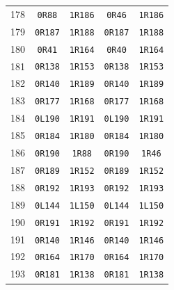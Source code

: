 \begin{longtable}{rcccc}
178 & \texttt{0R88} & \texttt{1R186} & \texttt{0R46} & \texttt{1R186} \\
179 & \texttt{0R187} & \texttt{1R188} & \texttt{0R187} & \texttt{1R188} \\
180 & \texttt{0R41} & \texttt{1R164} & \texttt{0R40} & \texttt{1R164} \\
181 & \texttt{0R138} & \texttt{1R153} & \texttt{0R138} & \texttt{1R153} \\
182 & \texttt{0R140} & \texttt{1R189} & \texttt{0R140} & \texttt{1R189} \\
183 & \texttt{0R177} & \texttt{1R168} & \texttt{0R177} & \texttt{1R168} \\
184 & \texttt{0L190} & \texttt{1R191} & \texttt{0L190} & \texttt{1R191} \\
185 & \texttt{0R184} & \texttt{1R180} & \texttt{0R184} & \texttt{1R180} \\
186 & \texttt{0R190} & \texttt{1R88} & \texttt{0R190} & \texttt{1R46} \\
187 & \texttt{0R189} & \texttt{1R152} & \texttt{0R189} & \texttt{1R152} \\
188 & \texttt{0R192} & \texttt{1R193} & \texttt{0R192} & \texttt{1R193} \\
189 & \texttt{0L144} & \texttt{1L150} & \texttt{0L144} & \texttt{1L150} \\
190 & \texttt{0R191} & \texttt{1R192} & \texttt{0R191} & \texttt{1R192} \\
191 & \texttt{0R140} & \texttt{1R146} & \texttt{0R140} & \texttt{1R146} \\
192 & \texttt{0R164} & \texttt{1R170} & \texttt{0R164} & \texttt{1R170} \\
193 & \texttt{0R181} & \texttt{1R138} & \texttt{0R181} & \texttt{1R138} \\
\end{longtable}\endgroup
